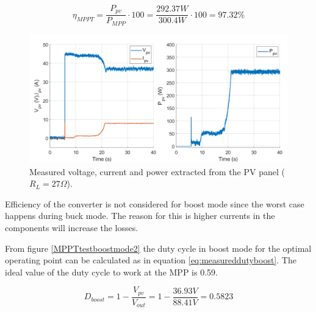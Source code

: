 \begin{equation} \label{eq:effMPPTboost}
\eta_{MPPT}= \dfrac{P_{pv}}{P_{MPP}} \cdot 100 = \dfrac{292.37W}{300.4W} \cdot 100 = 97.32\%  
\end{equation}


\begin{figure}[H]
	\begin{center}
		\includegraphics[width=1\textwidth]{../Pictures/P1/Test/Boost_mode_MPPT_Vin_Iin_Pin}
		\caption{Measured voltage, current and power extracted from the PV panel ($R_{L}=27\Omega$).}
		\label{MPPTtestboostmode1}
	\end{center}	
\end{figure}


Efficiency of the converter is not considered for boost mode since the worst case happens during buck mode. The reason for this is higher currents in the components will increase the losses.

From figure \ref{MPPTtestboostmode2} the duty cycle in boost mode for the optimal operating point can be calculated as in equation \ref{eq:measureddutyboost}. The ideal value of the duty cycle to work at the MPP is 0.59.

\begin{equation} \label{eq:measureddutyboost}
D_{boost}= 1 - \dfrac{V_{pv}}{V_{out}} = 1 - \dfrac{36.93V}{88.41V} = 0.5823
\end{equation}

